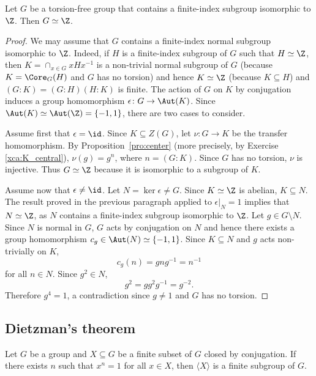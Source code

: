 \begin{theorem}
	Let $G$ be a torsion-free group that contains a finite-index subgroup isomorphic to  
	$\Z$. Then $G\simeq\Z$.
\end{theorem}

\begin{proof}
	We may assume that $G$ contains a finite-index normal subgroup isomorphic to $\Z$. Indeed, 
	if $H$ is a finite-index subgroup of $G$ such that $H\simeq\Z$, then 
	$K=\cap_{x\in G}xHx^{-1}$ is a non-trivial normal subgroup of $G$ (because $K=\Core_G(H)$ and 
	$G$ has no torsion) and hence $K\simeq\Z$ (because  
	$K\subseteq H$) and $(G:K)=(G:H)(H:K)$ is finite.
	The action of $G$ on $K$ by conjugation induces a group homomorphism  
	$\epsilon\colon G\to\Aut(K)$. Since $\Aut(K)\simeq\Aut(\Z)=\{-1,1\}$, 
	there are two cases to consider.
	
	Assume first that $\epsilon=\id$. Since $K\subseteq Z(G)$, let
	$\nu\colon G\to K$ be the transfer homomorphism. By
	Proposition~\ref{pro:center} (more precisely, 
	by Exercise \ref{xca:K_central}), $\nu(g)=g^n$, where $n=(G:K)$. Since
	$G$ has no torsion, $\nu$ is injective. Thus
	$G\simeq\Z$ because it is isomorphic to a subgroup of $K$.

	Assume now that $\epsilon\ne\id$. Let $N=\ker\epsilon\ne G$. Since
	$K\simeq\Z$ is abelian, $K\subseteq N$. The result proved in the previous paragraph 
	applied to $\epsilon|_N=1$ implies that $N\simeq\Z$, as 
	$N$ contains a finite-index subgroup isomorphic to $\Z$. Let $g\in G\setminus N$. 
	Since $N$ is normal in $G$, $G$ acts by conjugation on $N$ and hence 
	there exists a group homomorphism $c_g\in\Aut(N)\simeq\{-1,1\}$. Since
	$K\subseteq N$ and $g$ acts non-trivially on $K$, 
	\[
	c_g(n)=gng^{-1}=n^{-1}
	\]
	for all $n\in N$.  Since 
	$g^2\in N$, 
	\[
		g^2=gg^2g^{-1}=g^{-2}.
	\]
	Therefore $g^4=1$, a contradiction since $g\ne1$ and $G$ has no torsion.
\end{proof}

\subsection{Dietzman's theorem}

\begin{theorem}[Dietzmann]
	\label{thm:Dietzmann} 
	Let $G$ be a group and $X\subseteq G$ be a finite subset of $G$ closed by
	conjugation. If there exists $n$ such that $x^n=1$ for all $x\in X$, then
	$\langle X\rangle$ is a finite subgroup of $G$.
\end{theorem}

